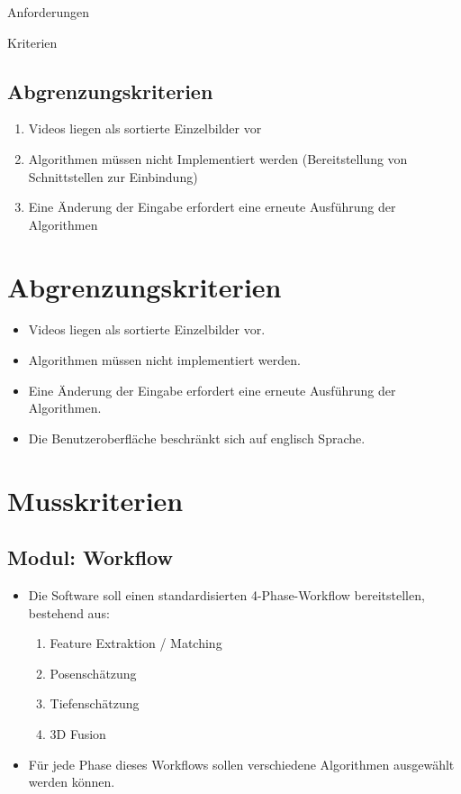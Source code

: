 Anforderungen

Kriterien

\subsection{Abgrenzungskriterien}
\begin{enumerate}[ align=left, label={\textbf{\textbackslash AK1\arabic*0\textbackslash}}]
\item Videos liegen als sortierte Einzelbilder vor
\item Algorithmen müssen nicht Implementiert werden
(Bereitstellung von Schnittstellen zur Einbindung)
\item Eine Änderung der Eingabe erfordert eine erneute Ausführung der Algorithmen
\end{enumerate}

\section{Abgrenzungskriterien}
\begin{itemize}
	\item Videos liegen als sortierte Einzelbilder vor.
	\item Algorithmen müssen nicht implementiert werden.
	\item Eine Änderung der Eingabe erfordert eine erneute Ausführung der Algorithmen.
	\item Die Benutzeroberfläche beschränkt sich auf englisch Sprache.
\end{itemize}

\section{Musskriterien}
\subsection{Modul: Workflow}
\begin{itemize}
	\item Die Software soll einen standardisierten 4-Phase-Workflow bereitstellen, bestehend aus:
	\begin{enumerate}
		\item Feature Extraktion / Matching
		\item Posenschätzung
		\item Tiefenschätzung
		\item 3D Fusion
	\end{enumerate}
	\item Für jede Phase dieses Workflows sollen verschiedene Algorithmen ausgewählt werden können.
\end{itemize}
